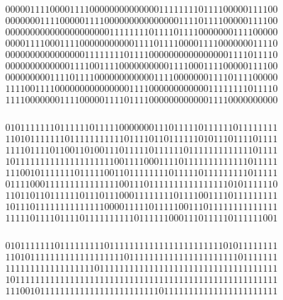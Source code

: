 \begin{figure}%
{\tt $$\begin{array}{c}
0000011110000111100000000000000111111110111100000111100\\
0000000111100000111100000000000000011110111100000111100\\
0000000000000000000001111111101111011110000000111100000\\
0000111100011110000000000011110111100001111000000011110\\
0000000000000000111111110111100000000000000001111011110\\
0000000000000111100111100000000001111000111100000111100\\
0000000001111011110000000000001111000000011110111100000\\
1111001111000000000000000111100000000000011111111011110\\
1111000000011110000011110111100000000000011110000000000\\
\end{array}$$
$$\begin{array}{c}
0101111111011111101111100000001110111110111111011111111\\
1101011111110111111111110111101101111110101110111101111\\
1111011110110011010011101111101111110111111111111101111\\
1011111111111111111111001111000111101111111111111011111\\
1110010111111101111100110111111110111110111111111011111\\
0111100011111111111111100111011111111111111110101111110\\
1101101101111110111011100011111111011110011110111111111\\
1011101111111111111100001111101111100111011111111111111\\
1111101111011110111111111101111110001110111110111111001\\
\end{array}$$
$$\begin{array}{c}
0101111111011111111101111111111111111111111101011111111\\
1101011111111111111111110111111111111111111111101111111\\
1111111111111111110111111111111111111111111111111111111\\
1011111111111111111111111111111111111111111111111111111\\
1110010111111111111111111111111011111111111111111111111\\

\end{array}$$}
\end{figure}
